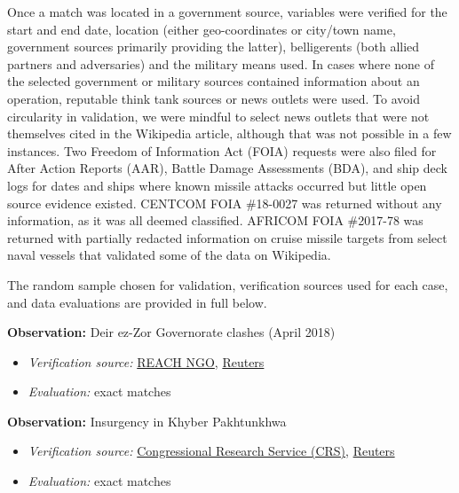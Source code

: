 \documentclass[fleqn,12pt]{article}
\begin{document}
Once a match was located in a government source, variables were verified for the start and end date, location (either geo-coordinates or city/town name,  government sources primarily providing the latter), belligerents (both allied partners and adversaries) and the military means used. In cases where none of the selected government or military sources contained information about an operation, reputable think tank sources or news outlets were used. To avoid circularity in validation, we were mindful to select news outlets that were not themselves cited in the Wikipedia article, although that was not possible in a few instances. Two Freedom of Information Act (FOIA) requests were also filed for After Action Reports (AAR), Battle Damage Assessments (BDA), and ship deck logs for dates and ships where known missile attacks occurred but little open source evidence existed. CENTCOM FOIA \#18-0027 was returned without any information, as it was all deemed classified. AFRICOM FOIA \#2017-78 was returned with partially redacted information on cruise missile targets from select naval vessels that validated some of the data on Wikipedia.

The random sample chosen for validation, verification sources used for each case, and data evaluations are provided in full below. 

\vspace{0.3cm}
\noindent
\textbf{Observation:} Deir ez-Zor Governorate clashes (April 2018)
\begin{itemize}
    \item \textit{Verification source:} \href{https://reliefweb.int/report/syrian-arab-republic/informal-site-and-settlement-profiles-deir-ez-zor-governorate-syria-september-2022}{REACH NGO}, \href{https://www.reuters.com/article/us-mideast-crisis-syria-euphrates/syrian-army-says-captured-villages-from-u-s-backed-forces-idUSKBN1I00EX}{Reuters}
    \item \textit{Evaluation:} exact matches
\end{itemize}

\noindent
\textbf{Observation:} Insurgency in Khyber Pakhtunkhwa
\begin{itemize}
    \item \textit{Verification source:} \href{https://crsreports.congress.gov/product/pdf/IF/IF11934}{Congressional Research Service (CRS)}, \href{https://www.reuters.com/article/us-pakistan-militants-alliance-idUSKBN0M81WF20150312}{Reuters}
    \item \textit{Evaluation:} exact matches
\end{itemize}
\end{document}
